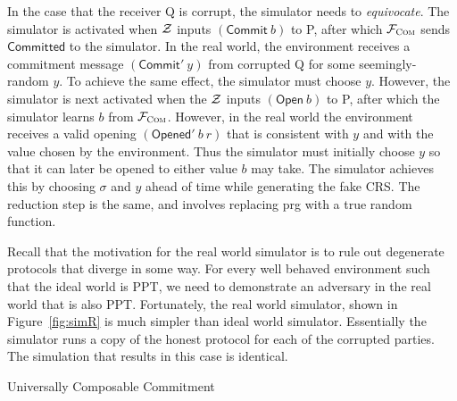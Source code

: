 In the case that the receiver Q is corrupt, the simulator needs to \emph{equivocate}.
The simulator is activated when $\mathcal{{Z}}$ inputs $(\mathsf{Commit}~b)$ to P, after which $\mathcal{{F}}_{\textsc{Com}}$ sends $\mathsf{Committed}$ to the simulator.
In the real world, the environment receives a commitment message $(\mathsf{Commit}'~y)$ from corrupted Q for some seemingly-random $y$. To achieve the same effect, the simulator must choose $y$. However, the simulator is next activated when the $\mathcal{{Z}}$ inputs $(\mathsf{Open}~b)$ to P, after which the simulator learns $b$ from $\mathcal{{F}}_{\textsc{Com}}$. However, in the real world the environment receives a valid opening $(\mathsf{Opened}'~b~r)$ that is consistent with  $y$ and with the value chosen by the environment. Thus the simulator must initially choose $y$ so that it can later be opened to either value $b$ may take. The simulator achieves this by choosing $\sigma$ and $y$ ahead of time while generating the fake CRS. The reduction step is the same, and involves replacing prg with a true random function.

Recall that the motivation for the real world simulator is to rule out degenerate protocols that diverge in some way.
For every well behaved environment such that the ideal world is \textsf{PPT}, we need to demonstrate an adversary in the real world that is also \textsf{PPT}.
Fortunately, the real world simulator, shown in Figure~\ref{fig:simR} is much simpler than ideal world simulator.
Essentially the simulator runs a copy of the honest protocol for each of the corrupted parties. The simulation that results in this case is identical.

\begin{algorithm}
\DontPrintSemicolon

\smallskip
{}
\smallskip

\caption{Universally Composable Commitment}
\label{alg:com}
\end{algorithm}

